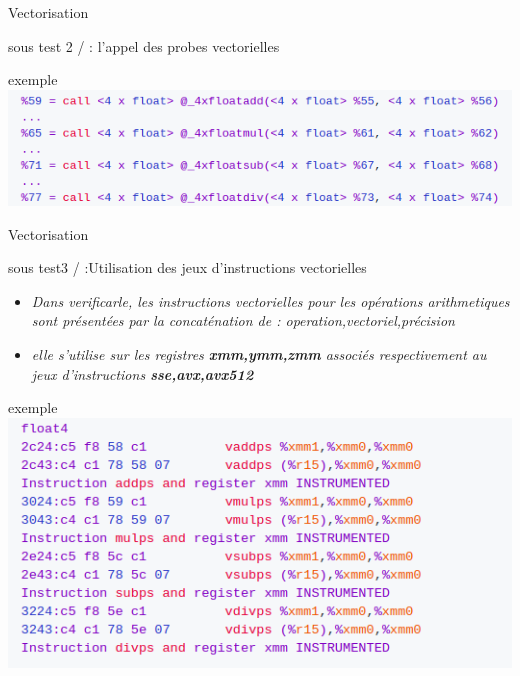 \documentclass{beamer}
\begin{document}
\begin{frame}{Vectorisation}
\begin{block}{sous test 2 / : l'appel des probes vectorielles}
\end{block}
\begin{block}{exemple}
  \centering\includegraphics[scale=0.5]{../ressources/appel_des_fonction.png}
\end{block}


  
        
\end{frame}

\begin{frame}{Vectorisation}   

\begin{block}{sous test3 / :Utilisation des jeux d’instructions vectorielles}
     \begin{itemize}
     \item\textit{Dans verificarle, les instructions vectorielles pour les opérations arithmetiques sont présentées par la concaténation de  : operation,vectoriel,précision } 
      \item\textit{elle s'utilise sur les registres \textbf{xmm,ymm,zmm } associés respectivement au jeux d'instructions \textbf{sse,avx,avx512} } 
      
   \end{itemize}
  \end{block}
  \begin{block}{exemple}
  \centering\includegraphics[scale=0.4]{../ressources/ajout_instructions.png}
\end{block}
 \end{frame}
\end{document}
